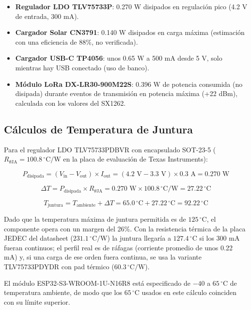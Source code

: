 \begin{itemize}[leftmargin=*]
    \item \textbf{Regulador LDO TLV75733P}: 0.270 W disipados en regulación pico (4.2 V de entrada, 300 mA).
    \item \textbf{Cargador Solar CN3791}: 0.140 W disipados en carga máxima (estimación con una eficiencia de 88\%, no verificada).
    \item \textbf{Cargador USB-C TP4056}: unos 0.65 W a 500 mA desde 5 V, solo mientras hay USB conectado (uso de banco).
    \item \textbf{Módulo LoRa DX-LR30-900M22S}: 0.396 W de potencia consumida (no disipada) durante eventos de transmisión en potencia máxima (+22 dBm), calculada con los valores del SX1262.
\end{itemize}

\subsection{Cálculos de Temperatura de Juntura}

Para el regulador LDO TLV75733PDBVR con encapsulado SOT-23-5 ($R_{\theta\text{JA}} = 100.8\,^\circ\text{C/W}$ en la placa de evaluación de Texas Instruments):

$$P_{\text{disipada}} = (V_{\text{in}} - V_{\text{out}}) \times I_{\text{out}} = (4.2\text{ V} - 3.3\text{ V}) \times 0.3\text{ A} = 0.270\text{ W}$$

$$\Delta T = P_{\text{disipada}} \times R_{\theta\text{JA}} = 0.270\text{ W} \times 100.8\,^\circ\text{C/W} = 27.22\,^\circ\text{C}$$

$$T_{\text{juntura}} = T_{\text{ambiente}} + \Delta T = 65.0\,^\circ\text{C} + 27.22\,^\circ\text{C} = 92.22\,^\circ\text{C}$$

Dado que la temperatura máxima de juntura permitida es de $125\,^\circ\text{C}$, el componente opera con un margen del 26\%. Con la resistencia térmica de la placa JEDEC del datasheet ($231.1\,^\circ\text{C/W}$) la juntura llegaría a $127.4\,^\circ\text{C}$ si los 300 mA fueran continuos; el perfil real es de ráfagas (corriente promedio de unos 0.22 mA) y, si una carga de ese orden fuera continua, se usa la variante TLV75733PDYDR con pad térmico ($60.3\,^\circ\text{C/W}$).

El módulo ESP32-S3-WROOM-1U-N16R8 está especificado de $-40$ a $65\,^\circ\text{C}$ de temperatura ambiente, de modo que los $65\,^\circ\text{C}$ usados en este cálculo coinciden con su límite superior.

